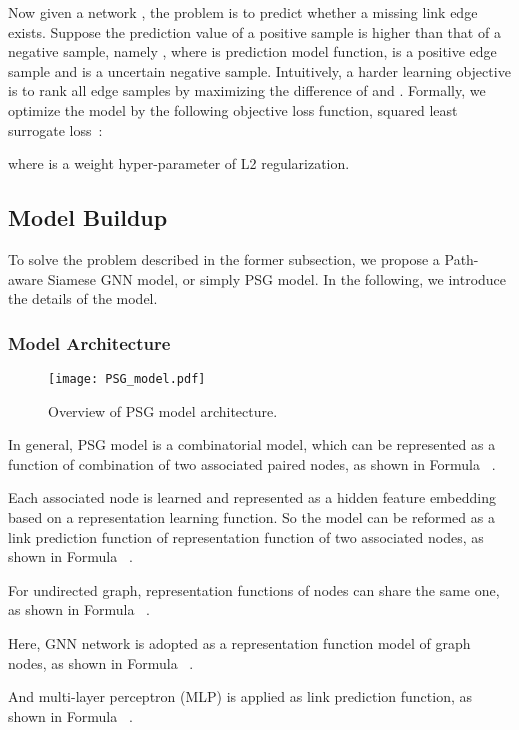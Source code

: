 \documentclass[sigconf]{acmart}
\begin{document}
Now given a  network , the problem is to predict whether a missing link edge  exists. 
Suppose the prediction value of a positive sample is higher than that of a negative sample, namely , where  is prediction model function,    is a positive edge sample and  is a uncertain negative sample. Intuitively, a harder learning objective is to rank all edge samples by maximizing the difference of  and . Formally, we optimize the model by the following objective loss function, squared least surrogate loss~\cite{gao2015consistency, wang2021pairwise}:


\noindent where  is a weight hyper-parameter  of L2 regularization. 

\subsection{Model Buildup}
To solve the problem described in the former subsection, we propose a Path-aware Siamese GNN model, or simply PSG model. In the following, we introduce the details of the  model.

\subsubsection{Model Architecture}
\begin{figure*}[htbp]
\texttt{[image: PSG\_model.pdf]}
\caption{Overview of PSG model architecture.} \label{fig_model}
\centering
\end{figure*}

In general, PSG model is a combinatorial model, which can be represented as a function of combination of two associated paired nodes, as shown in Formula ~.


Each associated node is learned and represented as a hidden feature embedding based on a representation learning function. So the model can be reformed as a link prediction function of representation function of two associated nodes, as shown in Formula ~.


For undirected graph, representation functions of nodes can share the same one, as shown in Formula ~.


Here, GNN network is adopted as a representation function model of graph nodes, as shown in Formula ~.



And multi-layer perceptron (MLP) is applied as link prediction function, as shown in Formula  ~.
\end{document}

